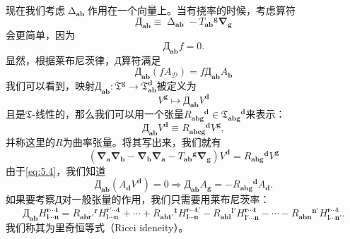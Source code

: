 现在我们考虑$\upDelta _{\boldsymbol{ab}}$作用在一个向量上。当有挠率的时候，考虑算符
\begin{equation*}
	\text{Д}_{\boldsymbol{ab}} \equiv \upDelta _{\boldsymbol{ab}} -T{_{\boldsymbol{ab}}}^{\boldsymbol{g}}\boldsymbol{\nabla }_{\boldsymbol{g}}
\end{equation*}
会更简单，因为
\begin{equation}
	\text{Д}_{\boldsymbol{ab}} f=0.
	\label{eq:5.4}
\end{equation}
显然，根据莱布尼茨律，$\text{Д}$算符满足
\begin{equation*}
	\text{Д}_{\boldsymbol{ab}}( fA_{\mathcal{D}}) =f\text{Д}_{\boldsymbol{ab}} A_{\boldsymbol{b}}
\end{equation*}
我们可以看到，映射$\text{Д}_{\boldsymbol{ab}} :\mathfrak{T}^{\boldsymbol{g}}\rightarrow \mathfrak{T}_{\boldsymbol{ab}}^{\boldsymbol{d}}$被定义为
\begin{equation*}
	V^{\boldsymbol{g}} \mapsto \text{Д}_{\boldsymbol{ab}} V^{\boldsymbol{d}}
\end{equation*}
且是$\mathfrak{T}$-线性的，那么我们可以用一个张量$R{_{\boldsymbol{abg}}}^{\boldsymbol{d}} \in \mathfrak{T}{_{\boldsymbol{abg}}}^{\boldsymbol{d}}$来表示：
\begin{equation*}
	\text{Д}_{\boldsymbol{ab}} V^{\boldsymbol{d}} \equiv R{_{\boldsymbol{abcg}}}^{\boldsymbol{d}} V^{\boldsymbol{g}} ,
\end{equation*}
并称这里的$R$为曲率张量。将其写出来，我们就有
\begin{equation}
	(\boldsymbol{\nabla }_{\boldsymbol{a}}\boldsymbol{\nabla }_{\boldsymbol{b}} -\boldsymbol{\nabla }_{\boldsymbol{b}}\boldsymbol{\nabla }_{\boldsymbol{a}} -T{_{\boldsymbol{ab}}}^{\boldsymbol{g}}\boldsymbol{\nabla }_{\boldsymbol{g}} )V^{\boldsymbol{d}} =R{_{\boldsymbol{abg}}}^{\boldsymbol{d}} V^{\boldsymbol{g}}
	\label{eq:5.5}
\end{equation}
由于\ref{eq:5.4}，我们知道
\begin{equation*}
	\text{Д}_{\boldsymbol{ab}} (A_{\boldsymbol{d}} V^{\boldsymbol{d}} )=0\Rightarrow \text{Д}_{\boldsymbol{ab}} A_{\boldsymbol{g}} =-R{_{\boldsymbol{abg}}}^{\boldsymbol{d}} A_{\boldsymbol{d}} .
\end{equation*}
如果要考察$\text{Д}$对一般张量的作用，我们只需要用莱布尼茨率：
\begin{equation}
	\text{Д}_{\boldsymbol{ab}} H_{\boldsymbol{l} \cdots \boldsymbol{n}}^{\boldsymbol{r} \cdots \boldsymbol{t}} =R{_{\boldsymbol{abr} '}}^{\boldsymbol{r}} H_{\boldsymbol{l} \cdots \boldsymbol{n}}^{\boldsymbol{r} '\cdots \boldsymbol{t}} +\cdots +R{_{\boldsymbol{abt} '}}^{\boldsymbol{t}} H_{\boldsymbol{l} \cdots \boldsymbol{n}}^{\boldsymbol{r} \cdots \boldsymbol{t} '} -R{_{\boldsymbol{abl}}}^{\boldsymbol{l} '} H_{\boldsymbol{l} '\cdots \boldsymbol{n}}^{\boldsymbol{r} \cdots \boldsymbol{t}} -\cdots -R{_{\boldsymbol{abn}}}^{\boldsymbol{n} '} H_{\boldsymbol{l} \cdots \boldsymbol{n} '}^{\boldsymbol{r} \cdots \boldsymbol{t}} .
	\label{eq:5.6}
\end{equation}
我们称其为里奇恒等式（Ricci ideneity）。



